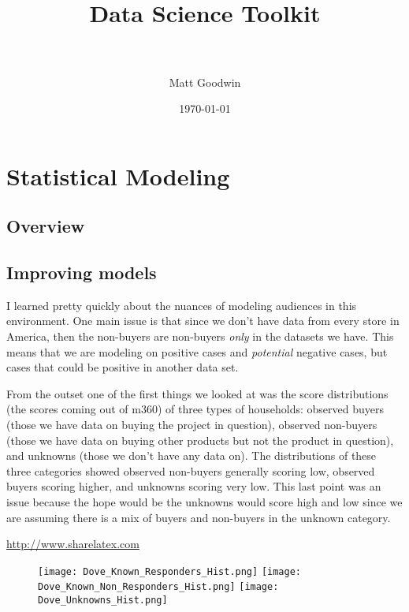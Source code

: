 \documentclass[paper=a4, fontsize=11pt]{scrartcl} %
\title{	
\normalfont \normalsize 
\horrule{0.5pt} \\[0.4cm] %
\huge Data Science Toolkit \\ %
\horrule{2pt} \\[0.5cm] %
}
\author{Matt Goodwin} %
\date{\normalsize\today} %
\numberwithin{equation}{section} %
\numberwithin{figure}{section} %
\numberwithin{table}{section} %
\begin{document}
\maketitle %

\tableofcontents
\newpage


\section{Statistical Modeling}
\subsection{Overview}



\subsection{Improving models}
I learned pretty quickly about the nuances of modeling audiences in this environment. One main issue is that since we don't have data from every store in America, then the non-buyers are non-buyers \emph{only} in the datasets we have. This means that we are modeling on positive cases and \emph{potential} negative cases, but cases that could be positive in another data set.

From the outset one of the first things we looked at was the score distributions (the scores coming out of m360) of three types of households: observed buyers (those we have data on buying the project in question), observed non-buyers (those we have data on buying other products but not the product in question), and unknowns (those we don't have any data on). The distributions of these three categories showed observed non-buyers generally scoring low, observed buyers scoring higher, and unknowns scoring very low. This last point was an issue because the hope would be the unknowns would score high and low since we are assuming there is a mix of buyers and non-buyers in the unknown category. 

\url{http://www.sharelatex.com}

\begin{figure}[!htb]
  \texttt{[image: Dove\_Known\_Responders\_Hist.png]}
\endminipage\hfill
{}
  \texttt{[image: Dove\_Known\_Non\_Responders\_Hist.png]}
\endminipage\hfill
{}%
  \texttt{[image: Dove\_Unknowns\_Hist.png]}
\endminipage
\end{figure}
\end{document}

